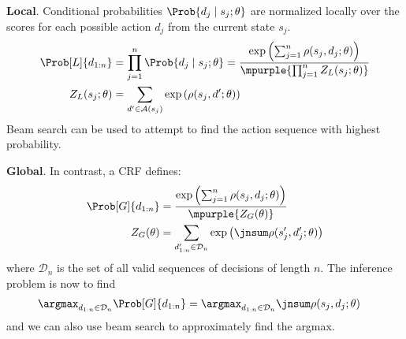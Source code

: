 \documentclass[11pt]{article}
\begin{document}
\begin{compactitem}
	\item \textbf{Local}. Conditional probabilities $\Prob{d_j \mid s_j; \theta }$ are normalized locally over the scores for each possible action $d_j$ from the current state $s_j$. 
	\begin{align}
		\Prob[L]{d_{1:n}} 
		&= \prod_{j = 1}^{n} \Prob{d_j \mid s_j; \theta } 
		= \dfrac{   \exp \left( \sum_{j = 1}^{n} \rho  ( s_j, d_j ; \theta  ) \right)
			}{ \mpurple{ \prod_{j = 1}^{n} Z_L (s_j; \theta) }  } \\
		Z_L(s_j; \theta)
		&= \sum_{ d' \in \mathcal{A}(s_j) } \exp \left( \rho ( s_j, d'; \theta )  \right)
	\end{align}
	Beam search can be used to attempt to find the action sequence with highest probability. 
	
	\item \textbf{Global}. In contrast, a CRF defines:
	\begin{align}
		\Prob[G]{d_{1:n}}
		&= \dfrac{   \exp \left( \sum_{j = 1}^{n} \rho  ( s_j, d_j ; \theta  ) \right)
		}{ \mpurple{Z_G (\theta)}  } \\
		Z_G(\theta) 
		&=
		\sum_{d_{1:n}' \in \mathcal{D}_n } \exp \left( 
			\jnsum \rho ( s_j', d_j'; \theta )
		\right)
	\end{align}
	where $\mathcal{D}_n$ is the set of all valid sequences of decisions of length $n$. The inference problem is now to find
	\begin{align}
		\argmax_{d_{1:n} \in \mathcal{D}_n} \Prob[G]{d_{1:n}}
		&= \argmax_{d_{1:n} \in \mathcal{D}_n} \jnsum \rho(s_j, d_j; \theta) 
	\end{align}
	and we can also use beam search to approximately find the argmax. 
\end{compactitem}
\end{document}
